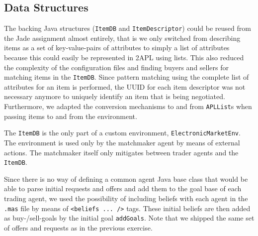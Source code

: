 \documentclass[a4paper,11pt]{article}
\begin{document}
\subsection{Data Structures}
The backing Java structures (\texttt{ItemDB} and \texttt{ItemDescriptor}) could be reused from the Jade assignment almost entirely, that is we only switched from describing items as a set of key-value-pairs of attributes to simply a list of attributes because this could easily be represented in 2APL using lists. This also reduced the complexity of the configuration files and finding buyers and sellers for matching items in the \texttt{ItemDB}. Since pattern matching using the complete list of attributes for an item is performed, the UUID for each item descriptor was not necessary anymore to uniquely identify an item that is being negotiated. Furthermore, we adapted the conversion mechanisms to and from \texttt{APLList}s when passing items to and from the environment.

The \texttt{ItemDB} is the only part of a custom environment, \texttt{ElectronicMarketEnv}. The environment is used only by the matchmaker agent by means of external actions. The matchmaker itself only mitigates between trader agents and the \texttt{ItemDB}.

Since there is no way of defining a common agent Java base class that would be able to parse initial requests and offers and add them to the goal base of each trading agent, we used the possibility of including beliefs with each agent in the \texttt{.mas} file by means of \texttt{<beliefs ... />} tags. These initial beliefs are then added as buy-/sell-goals by the initial goal \texttt{addGoals}. Note that we shipped the same set of offers and requests as in the previous exercise.
\end{document}
